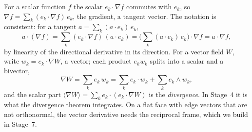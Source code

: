 For a scalar function $f$ the scalar $e_k\cdot\nabla f$ commutes with $e_k$, so $\nabla f = \sum_k (e_k\cdot\nabla f)\, e_k$, the gradient, a tangent vector. The notation is consistent: for a tangent $a = \sum_k (a\cdot e_k)\, e_k$,
\begin{equation*}
a\cdot(\nabla f) = \sum_k (e_k\cdot\nabla f)\,(a\cdot e_k) = \Big(\sum_k (a\cdot e_k)\, e_k\Big)\cdot\nabla f = a\cdot\nabla f ,
\end{equation*}
by linearity of the directional derivative in its direction. For a vector field $W$, write $w_k = e_k\cdot\nabla W$, a vector; each product $e_kw_k$ splits into a scalar and a bivector,
\begin{equation*}
\nabla W = \sum_k e_k\, w_k = \sum_k e_k\cdot w_k + \sum_k e_k\wedge w_k ,
\end{equation*}
and the scalar part $\langle\nabla W\rangle = \sum_k e_k\cdot(e_k\cdot\nabla W)$ is the \emph{divergence}. In Stage~4 it is what the divergence theorem integrates. On a flat face with edge vectors that are not orthonormal, the vector derivative needs the reciprocal frame, which we build in Stage~7.

